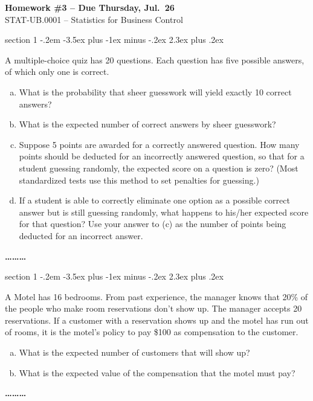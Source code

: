 \documentclass[11pt]{article}
\makeatletter
\newenvironment{problem}{\@startsection
       {section}
       {1}
       {-.2em}
       {-3.5ex plus -1ex minus -.2ex}
       {2.3ex plus .2ex}
       {\pagebreak[3]%
       \large\bf\noindent{Problem }
       }
       }
       {%
       \begin{center}\large\bf \ldots\ldots\ldots\end{center}}
\makeatother
\begin{document}
\begin{center}
  \large
  \textbf{Homework \#3 -- Due Thursday, Jul.~26} \\
  STAT-UB.0001 -- Statistics for Business Control \\
\end{center}


\thispagestyle{empty}

\begin{problem}{}

A multiple-choice quiz has 20 questions. Each question has five possible
answers, of which only one is correct.

\begin{enumerate}[(a)]

\item What is the probability that sheer guesswork will yield exactly 10 correct answers?

\item What is the expected number of correct answers by sheer guesswork?

\item Suppose 5 points are awarded for a correctly answered question. How many
points should be deducted for an incorrectly answered question, so that for a
student guessing randomly, the expected score on a question is zero? (Most
standardized tests use this method to set penalties for guessing.)

\item If a student is able to correctly eliminate one option as a possible
correct answer but is still guessing randomly, what happens to his/her
expected score for that question? Use your answer to (c) as the number of
points being deducted for an incorrect answer.

\end{enumerate}

\end{problem}

\begin{problem}{}

A Motel has 16 bedrooms. From past experience, the manager knows that 20\% of
the people who make room reservations don't show up. The manager accepts 20
reservations. If a customer with a reservation shows up and the motel has run
out of rooms, it is the motel's policy to pay \$100 as compensation to the
customer. 
\begin{enumerate}[(a)]
\item What is the expected number of customers that will show up? 

\item What is the expected value of the compensation that the motel must pay?

\end{enumerate}
\end{problem}
\end{document}
